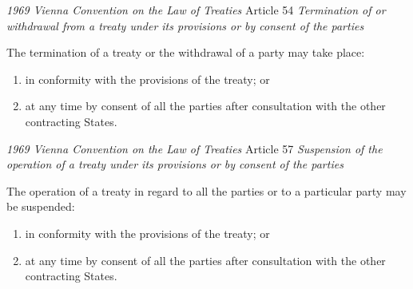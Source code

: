 \begin{conventiondetails}{\textit{1969 Vienna Convention on the Law of Treaties} Article 54}\label{VCLT Art 54}
    \flushleft
    \textit{Termination of or withdrawal from a treaty under its provisions or by consent of the parties }

    \vspace{\baselineskip}

    The termination of a treaty or the withdrawal of a party may take place:
    \begin{enumerate}[label=(\alph*)]
        \item in conformity with the provisions of the treaty; or 
        \item at any time by consent of all the parties after consultation with the other contracting States.
    \end{enumerate}
\end{conventiondetails}

\begin{conventiondetails}{\textit{1969 Vienna Convention on the Law of Treaties} Article 57}\label{VCLT Art 57}
    \flushleft
    \textit{Suspension of the operation of a treaty under its provisions or by consent of the parties }

    \vspace{\baselineskip}

    The operation of a treaty in regard to all the parties or to a particular party may be suspended:
    \begin{enumerate}[label=(\alph*)]
        \item in conformity with the provisions of the treaty; or
        \item at any time by consent of all the parties after consultation with the other contracting States.
    \end{enumerate}
\end{conventiondetails}

